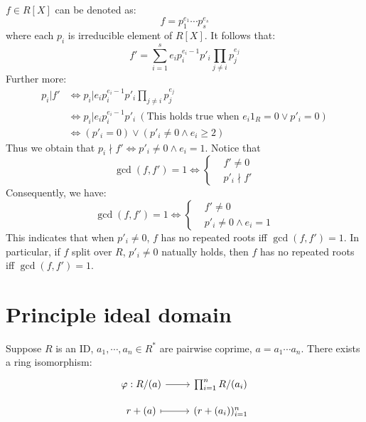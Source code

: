 $f \in R[X]$ can be denoted as:
\[
    f = p_1^{e_1} \cdots p_s^{e_s}
\]
where each $p_i$ is irreducible element of $R[X]$. It follows that:
\[
    f' = \sum_{i=1}^{s} e_i p_i^{e_i - 1} p'_i \prod_{j \neq i} p_{j}^{e_j}
\]
Further more:
\begin{align*}
    p_i | f' & \Leftrightarrow p_i | e_i p_i^{e_i - 1} p'_i \prod_{j \neq i} p_j^{e_j} \\
    & \Leftrightarrow p_i | e_i p_i^{e_i - 1} p'_i \ (\text{This holds true when } e_i 1_R = 0 \lor p'_i = 0) \\
    & \Leftrightarrow (p'_i = 0) \lor (p'_i \neq 0 \land e_i \geq 2)
\end{align*}
Thus we obtain that $p_i \nmid f' \Leftrightarrow p'_i \neq 0 \land e_i = 1$. Notice that
\[
    \gcd(f, f') = 1 \Leftrightarrow
    \left\{ 
        \begin{aligned}
            &f' \neq 0 \\
            &p'_i \nmid f'
        \end{aligned}
    \right.
\]
Consequently, we have:
\[
    \gcd(f, f') = 1 \Leftrightarrow
    \left\{ 
        \begin{aligned}
            &f' \neq 0 \\
            &p'_i \neq 0 \land e_i = 1
        \end{aligned}
    \right.
\]
This indicates that when $p'_i \neq 0$, $f$ has no repeated roots iff $\gcd(f, f') = 1$. In particular, if $f$ split over $R$, $p'_i \neq 0$ natually holds, then $f$ has no repeated roots iff $\gcd(f, f') = 1$.



\section{Principle ideal domain}


\begin{theorem}
    Suppose $R$ is an ID, $a_1, \cdots, a_n \in R^*$ are pairwise coprime, $a = a_1 \cdots a_n$. There exists a ring isomorphism:
    \[
        \begin{tikzcd}[row sep = small]
            \varphi: R / (a)  \arrow[r]
            & \prod_{i=1}^{n} R / (a_i) 
            \\
            r + (a)  \arrow[mapsto, r]
            & (r + (a_i))^n_{i=1}
        \end{tikzcd}
    \]
\end{theorem}

